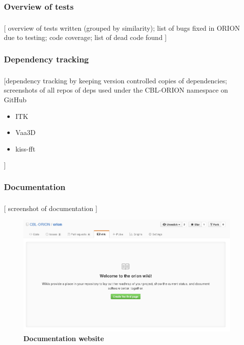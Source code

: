 \documentclass{beamer}
\begin{document}
\subsubsection{Overview of tests}
\begin{frame}\frametitle{\subsubsecname}
	[
		overview of tests written (grouped by similarity);
		list of bugs fixed in ORION due to testing;
		code coverage; list of dead code found
	]
\end{frame}

\subsubsection{Dependency tracking}
\begin{frame}\frametitle{\subsubsecname}
	[dependency tracking by keeping version controlled copies
		of dependencies; screenshots of all repos of deps used under the CBL-ORION
	namespace on GitHub
	\begin{itemize}
		\item ITK
		\item Vaa3D
		\item kiss-fft
	\end{itemize}
	]
\end{frame}

\subsubsection{Documentation}
\begin{frame}\frametitle{\subsubsecname}
	[ screenshot of documentation ]
		\begin{figure}[tbp]
			\centering
			\includegraphics[width=1.0\textwidth]{gfx/doc_placeholder}
			\caption{\textbf{Documentation website}
			}\label{fig:doc-wiki}
		\end{figure}
\end{frame}
\end{document}
